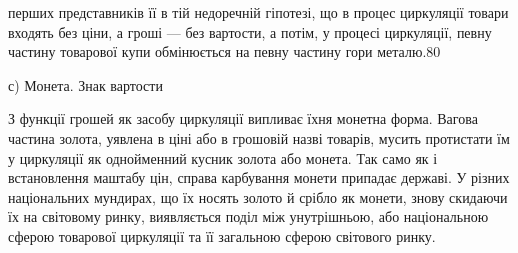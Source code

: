 перших представників її в тій недоречній гіпотезі, що в процес
циркуляції товари входять без ціни, а гроші — без вартости, а
потім, у процесі циркуляції, певну частину товарової купи обмінюється
на певну частину гори металю.80

с) Монета. Знак вартости

З функції грошей як засобу циркуляції випливає їхня монетна
форма. Вагова частина золота, уявлена в ціні або в грошовій
назві товарів, мусить протистати їм у циркуляції як однойменний
кусник золота або монета. Так само як і встановлення маштабу
цін, справа карбування монети припадає державі. У різних національних
мундирах, що їх носять золото й срібло як монети,
знову скидаючи їх на світовому ринку, виявляється поділ між
унутрішньою, або національною сферою товарової циркуляції
та її загальною сферою світового ринку.

